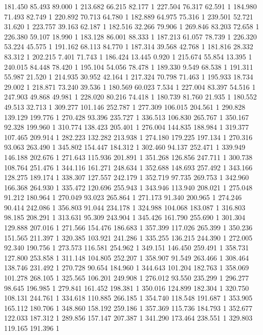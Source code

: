 	181.450	85.493	89.000	1
	213.682	66.215	82.177	1
	227.504	76.317	62.591	1
	184.980	71.493	82.749	1
	220.892	70.713	64.780	1
	182.889	64.975	75.316	1
	239.501	52.721	31.620	1
	223.757	39.163	62.187	1
	182.516	32.266	79.906	1
	269.846	83.203	72.658	1
	226.380	59.107	18.990	1
	183.128	86.001	88.333	1
	187.213	61.057	78.739	1
	226.320	53.224	45.575	1
	191.162	68.113	84.770	1
	187.314	39.568	42.768	1
	181.816	28.332	83.312	1
	202.215	7.401	71.743	1
	186.424	13.445	0.920	1
	215.674	55.854	13.395	1
	240.015	84.448	78.420	1
	195.104	54.056	78.478	1
	189.330	9.549	68.538	1
	191.311	55.987	21.520	1
	214.935	30.952	42.164	1
	217.324	70.798	71.463	1
	195.933	18.734	29.002	1
	218.871	73.240	39.536	1
	180.569	60.023	7.534	1
	227.004	83.397	54.516	1
	247.903	49.868	49.981	1
	228.020	80.216	74.418	1
	180.739	81.760	21.935	1
	180.552	49.513	32.713	1
	309.277	101.146	252.787	1
	277.309	106.015	204.561	1
	290.828	139.129	199.776	1
	270.428	93.396	235.727	1
	336.513	106.830	265.767	1
	350.167	92.328	199.960	1
	310.774	138.423	205.401	1
	276.004	144.835	188.984	1
	319.377	107.465	209.914	1
	282.223	132.282	213.938	1
	274.180	179.225	197.134	1
	270.316	93.063	263.490	1
	345.802	154.447	184.312	1
	302.460	94.137	252.471	1
	339.949	146.188	202.676	1
	271.643	115.936	201.891	1
	351.268	126.856	247.711	1
	300.738	108.764	251.476	1
	344.116	161.271	248.634	1
	352.688	148.693	257.492	1
	343.166	128.275	189.174	1
	338.307	127.557	242.179	1
	352.719	97.735	269.753	1
	342.960	166.368	264.930	1
	335.472	120.696	255.943	1
	343.946	113.940	208.021	1
	275.048	91.212	180.964	1
	270.049	93.023	265.864	1
	271.173	91.340	200.965	1
	274.246	90.414	242.086	1
	356.803	91.044	234.178	1
	324.988	104.068	183.087	1
	316.803	98.185	208.291	1
	313.631	95.309	243.904	1
	345.426	161.790	255.690	1
	301.304	129.888	207.016	1
	271.566	154.476	186.683	1
	357.399	117.026	265.399	1
	350.236	151.565	211.397	1
	320.385	103.921	241.286	1
	335.255	136.215	244.390	1
	272.005	92.340	190.756	1
	273.573	116.581	254.962	1
	349.151	146.450	259.491	1
	358.731	127.800	253.858	1
	311.148	104.805	252.207	1
	358.907	91.549	263.466	1
	308.464	138.746	231.492	1
	270.728	90.654	184.960	1
	344.643	101.204	182.763	1
	358.069	101.278	268.105	1
	325.565	106.201	249.908	1
	276.012	93.550	235.299	1
	296.277	98.645	196.985	1
	279.841	161.452	198.381	1
	350.016	124.899	182.304	1
	320.750	108.131	244.761	1
	334.618	110.885	266.185	1
	354.740	118.548	191.687	1
	353.905	165.112	180.706	1
	348.860	158.192	259.186	1
	357.369	115.736	184.793	1
	352.677	122.033	187.312	1
	289.856	157.147	207.387	1
	341.290	173.464	238.551	1
	329.803	119.165	191.396	1
